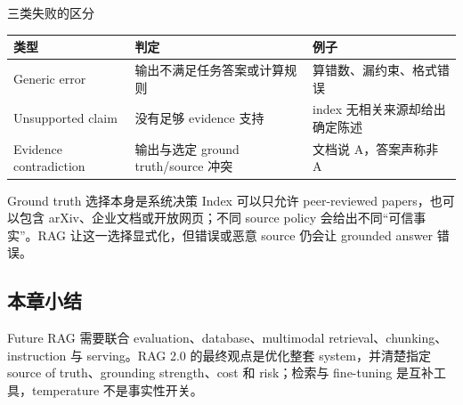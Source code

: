 \begin{importantbox}{三类失败的区分}
\begin{tabularx}{\textwidth}{L{0.20\textwidth}>{\raggedright\arraybackslash}X >{\raggedright\arraybackslash}X}
\toprule
类型 & 判定 & 例子 \\
\midrule
Generic error & 输出不满足任务答案或计算规则 & 算错数、漏约束、格式错误 \\
Unsupported claim & 没有足够 evidence 支持 & index 无相关来源却给出确定陈述 \\
Evidence contradiction & 输出与选定 ground truth/source 冲突 & 文档说 A，答案声称非 A \\
\bottomrule
\end{tabularx}
\end{importantbox}

\begin{warningbox}{Ground truth 选择本身是系统决策}
Index 可以只允许 peer-reviewed papers，也可以包含 arXiv、企业文档或开放网页；不同 source policy 会给出不同“可信事实”。RAG 让这一选择显式化，但错误或恶意 source 仍会让 grounded answer 错误。
\end{warningbox}



\subsection{本章小结}

Future RAG 需要联合 evaluation、database、multimodal retrieval、chunking、instruction 与 serving。RAG 2.0 的最终观点是优化整套 system，并清楚指定 source of truth、grounding strength、cost 和 risk；检索与 fine-tuning 是互补工具，temperature 不是事实性开关。

